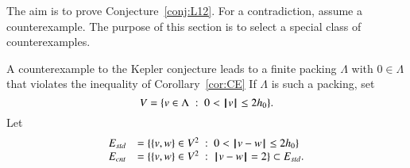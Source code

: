 The aim is to prove Conjecture~\ref{conj:L12}.  For a contradiction, assume a counterexample.  The purpose of this section is to select a special class of counterexamples.

A counterexample to the Kepler conjecture leads to a finite packing $\Lambda$ with $0\in\Lambda$ that violates the inequality of Corollary~\ref{cor:CE}
If $\Lambda$ is such a packing, set
$$
V = \{v\in \Lambda\ :\  0 < {{\hskip0.1em|\hskip-0.15em|\hskip0.1em}v{\hskip0.1em|\hskip-0.15em|\hskip0.1em}}\le 2{h_0}\}.
$$
Let
\begin{equation}\label{eqn:fan-edge}
\begin{array}{lll}
 E_{std} &= \{\{v,w\}\in V^2\ :\  0 < {\hskip0.1em|\hskip-0.15em|\hskip0.1em}v - w{\hskip0.1em|\hskip-0.15em|\hskip0.1em}\le 2{h_0} \}\\
 E_{cnt} &= \{\{v,w\}\in V^2\ :\  {\hskip0.1em|\hskip-0.15em|\hskip0.1em}v - w{\hskip0.1em|\hskip-0.15em|\hskip0.1em}= 2 \}\subset E_{std}.
\end{array}
\end{equation}
